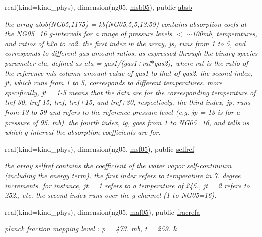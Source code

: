 \begin{DoxyCompactItemize}
real(kind=kind\+\_\+phys), dimension(ng05, \hyperlink{group__module__radlw__kgbnn_ga0f3b6573bfe94c5a5968cda2dc8b1adf}{msb05}), public \hyperlink{group__module__radlw__kgbnn_gaebc667b0569824bba455e822eaea6112}{absb}
\begin{DoxyCompactList}\small\item\em the array absb(\+N\+G05,1175) = kb(\+N\+G05,5,5,13\+:59) contains absorption coefs at the N\+G05=16 g-\/intervals for a range of pressure levels $<$ $\sim$100mb, temperatures, and ratios of h2o to co2. the first index in the array, js, runs from 1 to 5, and corresponds to different gas amount ratios, as expressed through the binary species parameter eta, defined as eta = gas1/(gas1+rat$\ast$gas2), where rat is the ratio of the reference mls column amount value of gas1 to that of gas2. the second index, jt, which runs from 1 to 5, corresponds to different temperatures. more specifically, jt = 1-\/5 means that the data are for the corresponding temperature of tref-\/30, tref-\/15, tref, tref+15, and tref+30, respectively. the third index, jp, runs from 13 to 59 and refers to the reference pressure level (e.\+g. jp = 13 is for a pressure of 95. mb). the fourth index, ig, goes from 1 to N\+G05=16, and tells us which g-\/interval the absorption coefficients are for. \end{DoxyCompactList}\item 
real(kind=kind\+\_\+phys), dimension(ng05, \hyperlink{group__module__radlw__kgbnn_ga1c9a43b7011e7328fa62d3ecd29acc73}{msf05}), public \hyperlink{group__module__radlw__kgbnn_ga3c727eabe159c88fca912f33a2b91943}{selfref}
\begin{DoxyCompactList}\small\item\em the array selfref contains the coefficient of the water vapor self-\/continuum (including the energy term). the first index refers to temperature in 7. degree increments. for instance, jt = 1 refers to a temperature of 245., jt = 2 refers to 252., etc. the second index runs over the g-\/channel (1 to N\+G05=16). \end{DoxyCompactList}\item 
real(kind=kind\+\_\+phys), dimension(ng05, \hyperlink{group__module__radlw__kgbnn_gaba904215976d7f4316b52c8f0cffe595}{maf05}), public \hyperlink{group__module__radlw__kgbnn_ga335fd60e59154f47724d2e25fdf0a5fb}{fracrefa}
\begin{DoxyCompactList}\small\item\em planck fraction mapping level \+: p = 473. mb, t = 259. k \end{DoxyCompactList}\item 

\end{DoxyCompactItemize}
